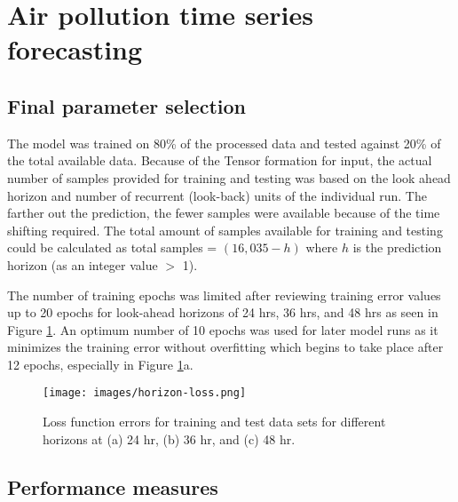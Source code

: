 \clearpage
\section{Air pollution time series forecasting}

\subsection{Final parameter selection}
The model was trained on 80\% of the processed data and tested against 20\% of the total available data. Because of the Tensor formation for input, the actual number of samples provided for training and testing was based on the look ahead horizon and number of recurrent (look-back) units of the individual run. The farther out the prediction, the fewer samples were available because of the time shifting required. The total amount of samples available for training and testing could be calculated as total samples = $(16,035 - h)$ where $h$ is the prediction horizon (as an integer value $>$ 1). 

The number of training epochs was limited after reviewing training error values up to 20 epochs for look-ahead horizons of 24 hrs, 36 hrs, and 48 hrs as seen in Figure \ref{fig:horizon-loss}. An optimum number of 10 epochs was used for later model runs as it minimizes the training error without overfitting which begins to take place after 12 epochs, especially in Figure \ref{fig:horizon-loss}a. 
%
\begin{figure}[H]
\centering
\texttt{[image: images/horizon-loss.png]}
\caption[Loss function errors of training and test data sets]{Loss function errors for training and test data sets for different horizons at (a) 24 hr, (b) 36 hr, and (c) 48 hr.}
\label{fig:horizon-loss}
\end{figure}
%

\subsection{Performance measures}

